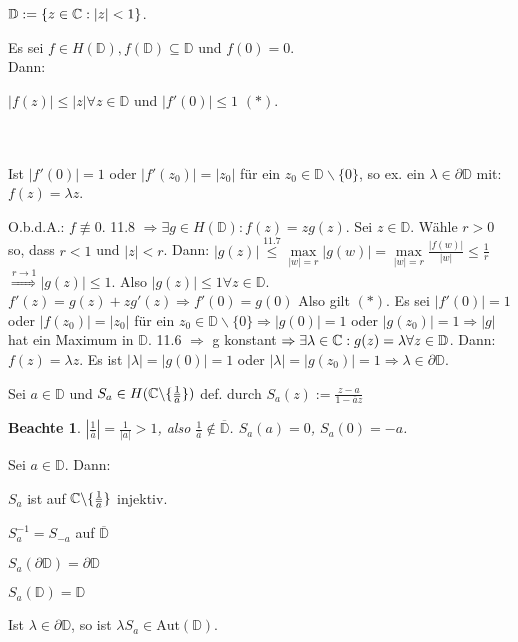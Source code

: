 \documentclass[a4paper,twoside,DIV15,BCOR12mm]{scrbook}
\def\MdD{\mathbb{D}}
\def\Rand{\partial}
\def\Aut{\text{Aut}}
\newtheorem{beachte}{Beachte}
\begin{document}
$\MdD := \{ z\in\MdC: |z|<1\}$.

\begin{satz}
Es sei $f\in H(\MdD), f(\MdD) \subseteq \MdD$ und $f(0) = 0$. \\
Dann: \\  \centerline{$|f(z)| \leq |z| \forall z \in \MdD$ und $|f'(0)|\leq 1$ $(*)$. } \\  \\ Ist $|f'(0)|=1$ oder $|f'(z_0)| = |z_0|$ für ein $z_0 \in \MdD \backslash \{0\}$, so ex. ein $\lambda \in \Rand \MdD$ mit: $f(z)=\lambda z$.
\end{satz}

\begin{beweis}
O.b.d.A.: $f\not\equiv 0$. 11.8 $\Rightarrow \exists g \in H(\MdD): f(z) = zg(z)$. Sei $z \in \MdD$. Wähle $r>0$ so, dass $r<1$ und $|z| < r$. Dann: $|g(z)| \stackrel{\text{11.7}}{\leq} \max\limits_{|w|=r} |g(w)| = \max\limits_{|w|=r} \frac{|f(w)|}{|w|} \leq \frac{1}{r} $ $\stackrel{r \rightarrow 1}{\Rightarrow} |g(z)| \leq1$. Also $|g(z)| \leq 1 \forall z \in \MdD$. 
$f'(z) = g(z) + zg'(z) \Rightarrow f'(0) = g(0)$ Also gilt $(*)$.
Es sei $|f'(0)| = 1$ oder $|f(z_0)| = |z_0|$ für ein $z_0 \in \MdD \backslash \{0\} \Rightarrow  |g(0)| = 1$ oder $|g(z_0)| = 1 \Rightarrow |g|$ hat ein Maximum in $\MdD$. 11.6 $\Rightarrow$ g konstant $\Rightarrow \exists \lambda \in \MdC: g(z) = \lambda \forall z \in \MdD$. Dann: $f(z) = \lambda z$. Es ist $|\lambda| = |g(0)| = 1$ oder $|\lambda| = |g(z_0)| = 1 \Rightarrow \lambda \in \partial \MdD$.
\end{beweis}

\begin{definition}
Sei $a\in\MdD$ und $S_a \in H(\mathbb{C} \backslash \{ \frac{1}{\overline{a}}\})$ def. durch $S_a(z) := \frac{z-a}{1-\overline{a}z}$
\end{definition}

\begin{beachte}
$|\frac{1}{\overline{a}}| = \frac{1}{|a|} > 1$, also $\frac{1}{\overline{a}} \notin \overline{\MdD}$. $S_a(a) = 0$, $S_a(0) = -a$.
\end{beachte}

\begin{satz}
Sei $a \in \MdD$. Dann:
\begin{liste}
\item $S_a$ ist auf $\mathbb{C} \backslash \{\frac{1}{\overline{a}}\}$ injektiv.
\item $S_a^{-1} = S_{-a}$ auf $\overline{\MdD}$
\item $S_a(\partial \MdD) = \partial \MdD$
\item $S_a(\MdD) = \MdD$
\item Ist $\lambda \in \partial \MdD$, so ist $\lambda S_a \in \Aut(\MdD)$.
\end{liste}
\end{satz}
\end{document}
